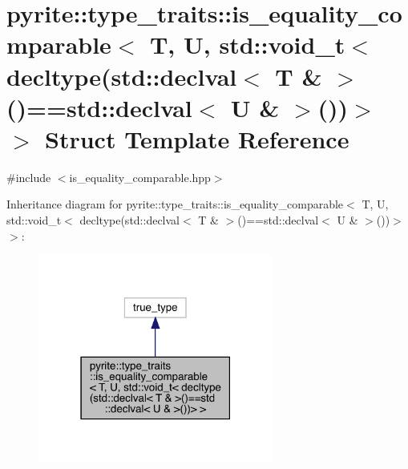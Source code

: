 \hypertarget{structpyrite_1_1type__traits_1_1is__equality__comparable_3_01_t_00_01_u_00_01std_1_1void__t_3_01fc9a5013d4b968e0ba738bd33a1d5ac1}{}\section{pyrite\+:\+:type\+\_\+traits\+:\+:is\+\_\+equality\+\_\+comparable$<$ T, U, std\+:\+:void\+\_\+t$<$ decltype(std\+:\+:declval$<$ T \& $>$()==std\+:\+:declval$<$ U \& $>$())$>$ $>$ Struct Template Reference}
\label{structpyrite_1_1type__traits_1_1is__equality__comparable_3_01_t_00_01_u_00_01std_1_1void__t_3_01fc9a5013d4b968e0ba738bd33a1d5ac1}


{\ttfamily \#include $<$is\+\_\+equality\+\_\+comparable.\+hpp$>$}



Inheritance diagram for pyrite\+:\+:type\+\_\+traits\+:\+:is\+\_\+equality\+\_\+comparable$<$ T, U, std\+:\+:void\+\_\+t$<$ decltype(std\+:\+:declval$<$ T \& $>$()==std\+:\+:declval$<$ U \& $>$())$>$ $>$\+:
\nopagebreak
\begin{figure}[H]
\begin{center}
\leavevmode
\includegraphics[width=219pt]{d5/d68/structpyrite_1_1type__traits_1_1is__equality__comparable_3_01_t_00_01_u_00_01std_1_1void__t_3_01f9de9051a5d07ee87f867fb2d84341aa}
\end{center}
\end{figure}



